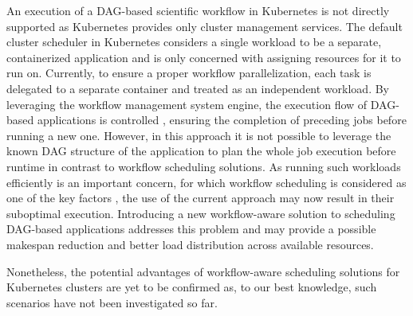An execution of a DAG-based scientific workflow in Kubernetes is not directly supported as Kubernetes provides only cluster management services.
The default cluster scheduler in Kubernetes considers a single workload to be a separate, containerized application and is only concerned with assigning resources for it to run on. %
Currently, to ensure a proper workflow parallelization, each task is delegated to a separate container and treated as an independent workload.
%
By leveraging the workflow management system engine, the execution flow of DAG-based applications is controlled \cite{b:Pegasus, b:Hyperflow}, ensuring the completion of preceding jobs before running a new one. 
%
%
However, in this approach it is not possible to leverage the known DAG structure of the application to plan the whole job execution before runtime in contrast to workflow scheduling solutions.
As running such workloads efficiently is an important concern, for which workflow scheduling is considered as one of the key factors \cite{b:Grid-Workflow-Scheduling-Strategies}, the use of the current approach may now result in their suboptimal execution.
Introducing a new workflow-aware solution to scheduling DAG-based applications addresses this problem and may provide a possible makespan reduction and better load distribution across available resources.

Nonetheless, the potential advantages of workflow-aware scheduling solutions for Kubernetes clusters are yet to be confirmed as, to our best knowledge, such scenarios have not been investigated so far. 


